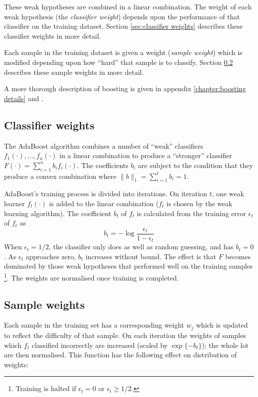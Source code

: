 These weak hypotheses are combined in a linear combination.
The weight of each weak hypothesis (the
\emph{classifier weight}) depends upon the performance of that
classifier on the training dataset.  Section \ref{sec:classifier
weights} describes these classifier weights in more detail.

Each sample in the training dataset is given a weight (\emph{sample
weight}) which is modified depending upon how ``hard'' that
sample is to classify.  Section \ref{sec:sample weights} describes
these sample weights in more detail.

A more thorough description of boosting is given in appendix
\ref{chapter:boosting details} and \cite{Freund96}.

\subsection{Classifier weights}
\label{sec:classifier weights}

The AdaBoost algorithm combines a number of ``weak'' classifiers
$f_1(\cdot), \ldots, f_n(\cdot)$ in a linear combination to produce a
``stronger'' classifier $F(\cdot) = \sum_{i=1}^{n} b_i f_i(\cdot)$.
The coefficients $b_i$ are subject to the condition that they produce a
convex combination where $\|b\|_1 = \sum_{i=1}^{t} b_i = 1$.

AdaBoost's training process is divided into iterations.  On iteration
$t$, one weak learner $f_t(\cdot)$ is added to the linear
combination ($f_t$ is chosen by the weak learning algorithm).  The
coefficient $b_t$ of $f_t$ is calculated from the 
training error $\epsilon_t$ of $f_t$ as 
%
\begin{equation}
b_t = - \log \frac{\epsilon_t}{1 - \epsilon_t}
\label{eqn:theory:bt}
\end{equation}
%
When $\epsilon_t = 1/2$, the classifier only does as
well as random guessing, and has $b_t = 0$.  As
$\epsilon_t$ approaches zero, $b_t$ increases without bound.  The
effect is that $F$ becomes dominated by those weak hypotheses that
performed well on the training samples
\footnote{Training is halted if $\epsilon_t = 0$ or $\epsilon_t \geq 1/2$.}.  The weights are normalised once training is completed.


\subsection{Sample weights}
\label{sec:sample weights}

Each sample in the training set has a corresponding weight $w_j$ which
is updated to reflect the difficulty of that sample.  On each iteration the
weights of samples which $f_t$ classified incorrectly are increased
(scaled by $\exp \{ -b_t \}$); the whole lot are then normalised.
This function has the following effect on distribution of weights:

